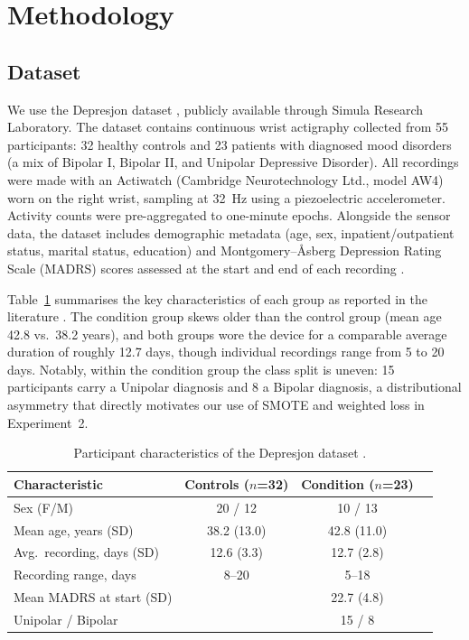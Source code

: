 \section{Methodology}

\subsection{Dataset}

We use the Depresjon dataset \cite{garcia2018depresjon}, publicly available through Simula Research Laboratory. The dataset contains continuous wrist actigraphy collected from 55 participants: 32 healthy controls and 23 patients with diagnosed mood disorders (a mix of Bipolar I, Bipolar II, and Unipolar Depressive Disorder). All recordings were made with an Actiwatch (Cambridge Neurotechnology Ltd., model AW4) worn on the right wrist, sampling at 32~Hz using a piezoelectric accelerometer. Activity counts were pre-aggregated to one-minute epochs. Alongside the sensor data, the dataset includes demographic metadata (age, sex, inpatient/outpatient status, marital status, education) and Montgomery--\r{A}sberg Depression Rating Scale (MADRS) scores assessed at the start and end of each recording \cite{garcia2018depresjon}.

Table~\ref{tab:dataset} summarises the key characteristics of each group as reported in the literature \cite{jakobsen2020applying}. The condition group skews older than the control group (mean age 42.8 vs.\ 38.2 years), and both groups wore the device for a comparable average duration of roughly 12.7 days, though individual recordings range from 5 to 20 days. Notably, within the condition group the class split is uneven: 15 participants carry a Unipolar diagnosis and 8 a Bipolar diagnosis, a distributional asymmetry that directly motivates our use of SMOTE and weighted loss in Experiment~2.

\begin{table}[h]
\centering
\caption{Participant characteristics of the Depresjon dataset \cite{jakobsen2020applying}.}
\label{tab:dataset}
\begin{tabular}{lccc}
\hline
\textbf{Characteristic} & \textbf{Controls ($n$=32)} & \textbf{Condition ($n$=23)} \\
\hline
Sex (F/M)                   & 20 / 12   & 10 / 13   \\
Mean age, years (SD)        & 38.2 (13.0) & 42.8 (11.0) \\
Avg.\ recording, days (SD)  & 12.6 (3.3) & 12.7 (2.8) \\
Recording range, days       & 8--20     & 5--18     \\
Mean MADRS at start (SD)    &         & 22.7 (4.8) \\
Unipolar / Bipolar          &         & 15 / 8    \\
\hline
\end{tabular}
\end{table}

